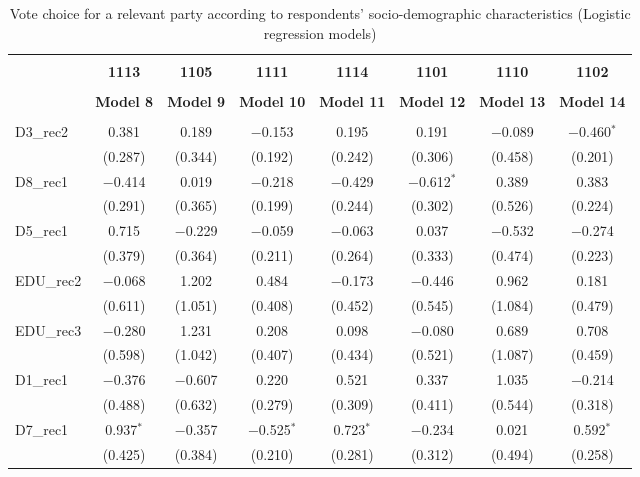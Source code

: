\documentclass[
]{article}
\begin{document}
\begin{table}[!htbp] \centering 
  \caption{Vote choice for a relevant party according to respondents' 
                       socio-demographic characteristics (Logistic regression models)} 
  \label{table:full_logit_fr} 
\begin{tabular}{@{\extracolsep{5pt}}lccccccc} 
\\[-1.8ex]\hline \\[-1.8ex] 
 & \textbf{1113} & \textbf{1105} & \textbf{1111} & \textbf{1114} & \textbf{1101} & \textbf{1110} & \textbf{1102} \\ 
\\[-1.8ex] & \textbf{Model 8} & \textbf{Model 9} & \textbf{Model 10} & \textbf{Model 11} & \textbf{Model 12} & \textbf{Model 13} & \textbf{Model 14}\\ 
\hline \\[-1.8ex] 
 D3\_rec2 & 0.381 & 0.189 & $-$0.153 & 0.195 & 0.191 & $-$0.089 & $-$0.460$^{*}$ \\ 
  & (0.287) & (0.344) & (0.192) & (0.242) & (0.306) & (0.458) & (0.201) \\ 
  D8\_rec1 & $-$0.414 & 0.019 & $-$0.218 & $-$0.429 & $-$0.612$^{*}$ & 0.389 & 0.383 \\ 
  & (0.291) & (0.365) & (0.199) & (0.244) & (0.302) & (0.526) & (0.224) \\ 
  D5\_rec1 & 0.715 & $-$0.229 & $-$0.059 & $-$0.063 & 0.037 & $-$0.532 & $-$0.274 \\ 
  & (0.379) & (0.364) & (0.211) & (0.264) & (0.333) & (0.474) & (0.223) \\ 
  EDU\_rec2 & $-$0.068 & 1.202 & 0.484 & $-$0.173 & $-$0.446 & 0.962 & 0.181 \\ 
  & (0.611) & (1.051) & (0.408) & (0.452) & (0.545) & (1.084) & (0.479) \\ 
  EDU\_rec3 & $-$0.280 & 1.231 & 0.208 & 0.098 & $-$0.080 & 0.689 & 0.708 \\ 
  & (0.598) & (1.042) & (0.407) & (0.434) & (0.521) & (1.087) & (0.459) \\ 
  D1\_rec1 & $-$0.376 & $-$0.607 & 0.220 & 0.521 & 0.337 & 1.035 & $-$0.214 \\ 
  & (0.488) & (0.632) & (0.279) & (0.309) & (0.411) & (0.544) & (0.318) \\ 
  D7\_rec1 & 0.937$^{*}$ & $-$0.357 & $-$0.525$^{*}$ & 0.723$^{*}$ & $-$0.234 & 0.021 & 0.592$^{*}$ \\ 
  & (0.425) & (0.384) & (0.210) & (0.281) & (0.312) & (0.494) & (0.258) \\ 

\end{tabular}
\end{table}
\end{document}
